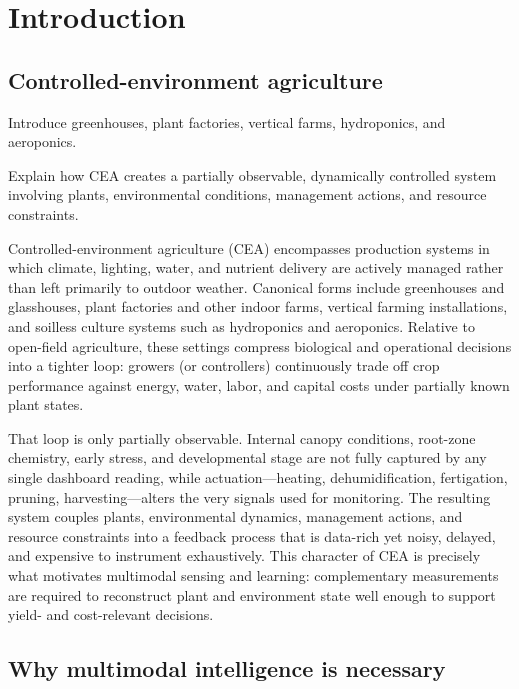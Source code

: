 \documentclass[lettersize,journal]{IEEEtran}
\begin{document}
\section{Introduction}

\subsection{Controlled-environment agriculture}

Introduce greenhouses, plant factories, vertical farms, hydroponics, and aeroponics. 

Explain how CEA creates a partially observable, dynamically controlled system involving plants, environmental conditions, management actions, and resource constraints.

Controlled-environment agriculture (CEA) encompasses production systems in which climate, lighting, water, and nutrient delivery are actively managed rather than left primarily to outdoor weather. Canonical forms include greenhouses and glasshouses, plant factories and other indoor farms, vertical farming installations, and soilless culture systems such as hydroponics and aeroponics. Relative to open-field agriculture, these settings compress biological and operational decisions into a tighter loop: growers (or controllers) continuously trade off crop performance against energy, water, labor, and capital costs under partially known plant states.

That loop is only partially observable. Internal canopy conditions, root-zone chemistry, early stress, and developmental stage are not fully captured by any single dashboard reading, while actuation---heating, dehumidification, fertigation, pruning, harvesting---alters the very signals used for monitoring. The resulting system couples plants, environmental dynamics, management actions, and resource constraints into a feedback process that is data-rich yet noisy, delayed, and expensive to instrument exhaustively. This character of CEA is precisely what motivates multimodal sensing and learning: complementary measurements are required to reconstruct plant and environment state well enough to support yield- and cost-relevant decisions.



\subsection{Why multimodal intelligence is necessary}
\end{document}
